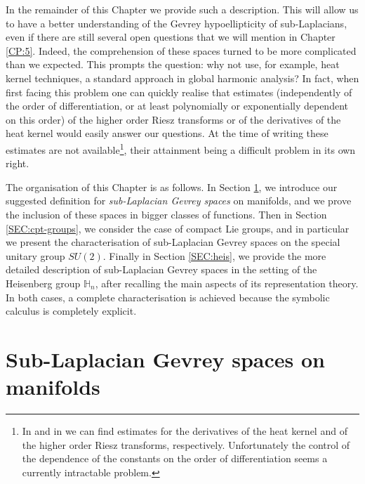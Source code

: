 \documentclass[12pt,oneside,a4paper]{book}
\numberwithin{equation}{section}     %
\theoremstyle{plain}
\theoremstyle{definition}
\newcommand{\h}{{\mathbb H}}
\begin{document}
In the remainder of this Chapter we provide such a description. This will allow us to have a better understanding of the Gevrey hypoellipticity of sub-Laplacians, even if there are still several open questions that we will mention in Chapter \ref{CP:5}. Indeed, the comprehension of these spaces turned to be more complicated than we expected. This prompts the question: why not use, for example, heat kernel techniques, a standard approach in global harmonic analysis? In fact, when first facing this problem one can quickly realise that estimates (independently of the order of differentiation, or at least polynomially or exponentially dependent on this order) of the higher order Riesz transforms or of the derivatives of the heat kernel  would easily answer our questions. At the time of writing these estimates are not available\footnote{In \cite{VSC1992} and in \cite{tER:97} we can find estimates for the derivatives of the heat kernel and of the higher order Riesz transforms, respectively. Unfortunately the control of the dependence of the constants on the order of differentiation seems a currently intractable problem.}, their attainment being a difficult problem in its own right. 

The organisation of this Chapter is as follows. In Section \ref{SEC:mfds}, we introduce our suggested definition for \textit{sub-Laplacian Gevrey spaces} on manifolds, and we prove the inclusion of these spaces in bigger classes of functions. Then in Section \ref{SEC:cpt-groups}, we consider the case of compact Lie groups, and in particular we present the characterisation of sub-Laplacian Gevrey spaces on the special unitary group $SU(2)$. Finally in Section \ref{SEC:heis}, we provide the more detailed description of sub-Laplacian Gevrey spaces in the setting of the Heisenberg group $\h_n$, after recalling the main aspects of its representation theory. In both cases, a complete characterisation is achieved because the symbolic calculus is completely explicit.

\section{Sub-Laplacian Gevrey spaces on manifolds}
\label{SEC:mfds}
\end{document}
